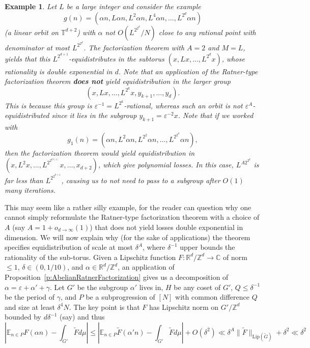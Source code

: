 \documentclass[11pt, a4paper]{amsart}
\theoremstyle{plain}
\theoremstyle{plain}
\newtheorem{example}{Example}
\theoremstyle{definition}
\theoremstyle{remark}
\numberwithin{equation}{section}
\numberwithin{lemma}{section}
\numberwithin{proposition}{section}
\numberwithin{corollary}{section}
\numberwithin{definition}{section}
\numberwithin{claim}{section}
\begin{document}
\begin{example}\label{e:badexample}
Let $L$ be a large integer and consider the example 
$$g(n) = (\alpha n, L\alpha n, L^2\alpha n, L^4\alpha n, \dots, L^{2^d}\alpha n)$$
(a linear orbit on $\mathbb{T}^{d + 2}$) with $\alpha$ not $O(L^{2^{2^d}}/N)$ close to any rational point with denominator at most $L^{2^{2^d}}$. The factorization theorem with $A = 2$ and $M = L$, yields that this $L^{2^{d + 1}}$-equidistributes in the subtorus $(x, Lx, \dots, L^{2^d}x)$, whose rationality is double exponential in $d$. Note that an application of the Ratner-type factorization theorem \textbf{does not} yield equidistribution in the larger group
$$(x, L x, \dots, L^{2^k}x, y_{k+ 1}, \dots, y_d).$$
This is because this group is $\varepsilon^{-1} = L^{2^k}$-rational, whereas such an orbit is not $\varepsilon^A$-equidistributed since it lies in the subgroup $y_{k + 1} = \varepsilon^{-2} x$. Note that if we worked with 
$$g_1(n) = (\alpha n, L^2\alpha n, L^{2^2}\alpha n, \dots, L^{2^{2^d}}\alpha n),$$
then the factorization theorem would yield equidistribution in $(x, L^2x, \dots, L^{2^{2^{O(1)}}}x, \dots, x_{d + 2})$, which give polynomial losses. In this case, $L^{A2^{2^k}}$ is far less than $L^{2^{2^{k+1}}}$, causing us to not need to pass to a subgroup after $O(1)$ many iterations.
\end{example}
This may seem like a rather silly example, for the reader can question why one cannot simply reformulate the Ratner-type factorization theorem with a choice of $A$ (say $A = 1 + o_{d \to \infty}(1)$) that does not yield losses double exponential in dimension. We will now explain why (for the sake of applications) the theorem specifies equidistribution of scale at most $\delta^A$, where $\delta^{-1}$ upper bounds the rationality of the sub-torus. Given a Lipschitz function $F\colon \mathbb{R}^d/\mathbb{Z}^d \to \mathbb{C}$ of norm $\le 1$, $\delta \in (0, 1/10)$, and $\alpha \in \mathbb{R}^d/\mathbb{Z}^d$, an application of Proposition~\ref{p:AbelianRatnerFactorization} gives us a decomposition of $\alpha = \varepsilon + \alpha' + \gamma$. Let $G'$ be the subgroup $\alpha'$ lives in, $H$ be any coset of $G'$, $Q \le \delta^{-1}$ be the period of $\gamma$, and $P$ be a subprogression of $[N]$ with common difference $Q$ and size at least $\delta^{4} N$. The key point is that $F$ has Lipschitz norm on $G'/\mathbb{Z}^d$ bounded by $d\delta^{-1}$ (say) and thus 
$$\left|\mathbb{E}_{n \in P} F(\alpha n) - \int_{G'} \tilde{F} d\mu\right| \le \left| \mathbb{E}_{n \in P} \tilde{F}(\alpha'n) - \int_{G'} \tilde{F} d\mu\right| + O(\delta^2) \ll \delta^A\|\tilde{F}\|_{\mathrm{Lip}(\tilde{G})} + \delta^{2} \ll \delta^2$$
\end{document}
